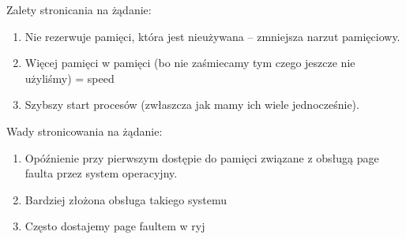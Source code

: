 Zalety stronicania na żądanie:
\begin{enumerate}
    \item Nie rezerwuje pamięci, która jest nieużywana -- zmniejsza narzut pamięciowy.
    \item Więcej pamięci w pamięci (bo nie zaśmiecamy tym czego jeszcze nie użyliśmy) = speed
    \item Szybszy start procesów (zwłaszcza jak mamy ich wiele jednocześnie).
\end{enumerate}

Wady stronicowania na żądanie:
\begin{enumerate}
    \item Opóźnienie przy pierwszym dostępie do pamięci związane z obsługą page faulta przez system operacyjny.
    \item Bardziej złożona obsługa takiego systemu
    \item Często dostajemy page faultem w ryj
\end{enumerate}